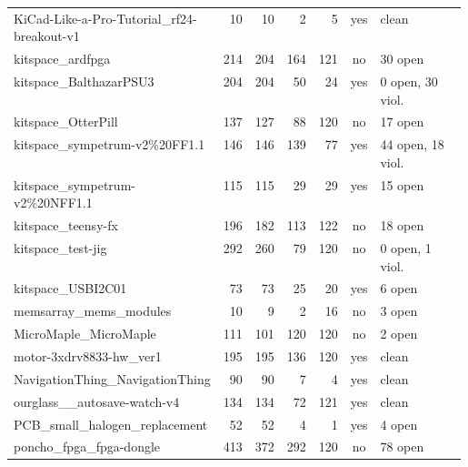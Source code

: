 \begin{longtable}{@{}p{0.36\linewidth}rrrrcp{0.22\linewidth}@{}}
KiCad-\allowbreak{}Like-\allowbreak{}a-\allowbreak{}Pro-\allowbreak{}Tutorial\_\allowbreak{}rf24-\allowbreak{}breakout-\allowbreak{}v1 & 10 & 10 & 2 & 5 & \textcolor{fraqua}{yes} & {\footnotesize clean} \\
kitspace\_\allowbreak{}ardfpga & 214 & 204 & 164 & 121 & \textcolor{frorange}{no} & {\footnotesize 30 open} \\
kitspace\_\allowbreak{}BalthazarPSU3 & 204 & 204 & 50 & 24 & \textcolor{fraqua}{yes} & {\footnotesize 0 open, 30 viol.} \\
kitspace\_\allowbreak{}OtterPill & 137 & 127 & 88 & 120 & \textcolor{frorange}{no} & {\footnotesize 17 open} \\
kitspace\_\allowbreak{}sympetrum-\allowbreak{}v2\%20FF1.1 & 146 & 146 & 139 & 77 & \textcolor{fraqua}{yes} & {\footnotesize 44 open, 18 viol.} \\
kitspace\_\allowbreak{}sympetrum-\allowbreak{}v2\%20NFF1.1 & 115 & 115 & 29 & 29 & \textcolor{fraqua}{yes} & {\footnotesize 15 open} \\
kitspace\_\allowbreak{}teensy-\allowbreak{}fx & 196 & 182 & 113 & 122 & \textcolor{frorange}{no} & {\footnotesize 18 open} \\
kitspace\_\allowbreak{}test-\allowbreak{}jig & 292 & 260 & 79 & 120 & \textcolor{frorange}{no} & {\footnotesize 0 open, 1 viol.} \\
kitspace\_\allowbreak{}USBI2C01 & 73 & 73 & 25 & 20 & \textcolor{fraqua}{yes} & {\footnotesize 6 open} \\
memsarray\_\allowbreak{}mems\_\allowbreak{}modules & 10 & 9 & 2 & 16 & \textcolor{frorange}{no} & {\footnotesize 3 open} \\
MicroMaple\_\allowbreak{}MicroMaple & 111 & 101 & 120 & 120 & \textcolor{frorange}{no} & {\footnotesize 2 open} \\
motor-\allowbreak{}3xdrv8833-\allowbreak{}hw\_\allowbreak{}ver1 & 195 & 195 & 136 & 120 & \textcolor{fraqua}{yes} & {\footnotesize clean} \\
NavigationThing\_\allowbreak{}NavigationThing & 90 & 90 & 7 & 4 & \textcolor{fraqua}{yes} & {\footnotesize clean} \\
ourglass\_\allowbreak{}\_\allowbreak{}autosave-\allowbreak{}watch-\allowbreak{}v4 & 134 & 134 & 72 & 121 & \textcolor{fraqua}{yes} & {\footnotesize clean} \\
PCB\_\allowbreak{}small\_\allowbreak{}halogen\_\allowbreak{}replacement & 52 & 52 & 4 & 1 & \textcolor{fraqua}{yes} & {\footnotesize 4 open} \\
poncho\_\allowbreak{}fpga\_\allowbreak{}fpga-\allowbreak{}dongle & 413 & 372 & 292 & 120 & \textcolor{frorange}{no} & {\footnotesize 78 open} \\

\end{longtable}
